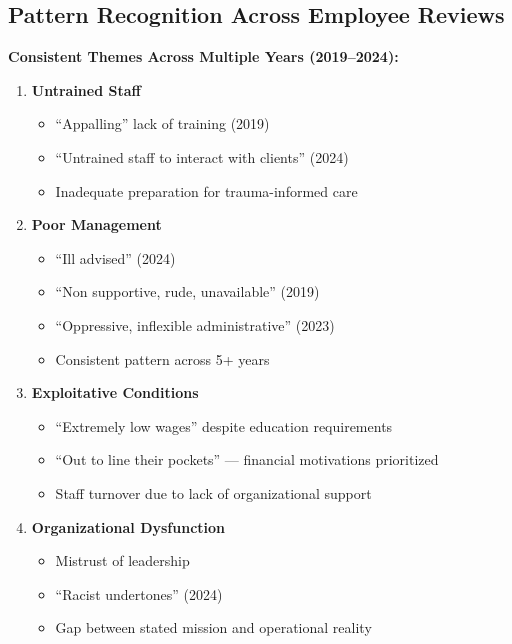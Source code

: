 \documentclass[11pt,letterpaper]{article}
\begin{document}
\subsection{Pattern Recognition Across Employee Reviews}

\textbf{Consistent Themes Across Multiple Years (2019--2024):}

\begin{enumerate}[leftmargin=*]
\item \textbf{Untrained Staff}
\begin{itemize}
\item ``Appalling'' lack of training (2019)
\item ``Untrained staff to interact with clients'' (2024)
\item Inadequate preparation for trauma-informed care
\end{itemize}

\item \textbf{Poor Management}
\begin{itemize}
\item ``Ill advised'' (2024)
\item ``Non supportive, rude, unavailable'' (2019)
\item ``Oppressive, inflexible administrative'' (2023)
\item Consistent pattern across 5+ years
\end{itemize}

\item \textbf{Exploitative Conditions}
\begin{itemize}
\item ``Extremely low wages'' despite education requirements
\item ``Out to line their pockets'' --- financial motivations prioritized
\item Staff turnover due to lack of organizational support
\end{itemize}

\item \textbf{Organizational Dysfunction}
\begin{itemize}
\item Mistrust of leadership
\item ``Racist undertones'' (2024)
\item Gap between stated mission and operational reality
\end{itemize}
\end{enumerate}

\newpage
\end{document}

